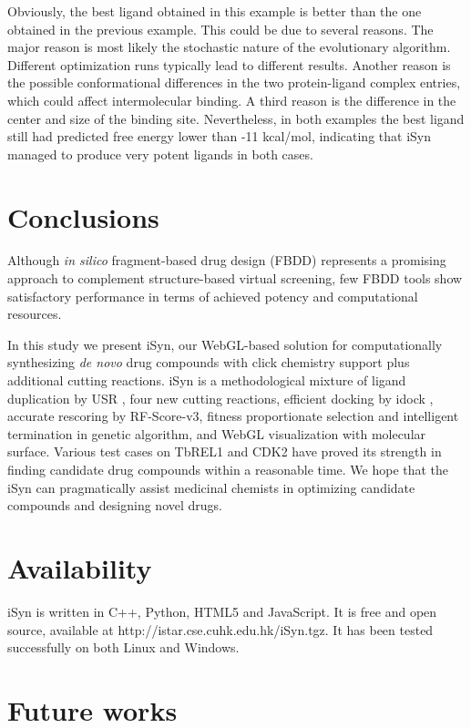 Obviously, the best ligand obtained in this example is better than the one obtained in the previous example. This could be due to several reasons. The major reason is most likely the stochastic nature of the evolutionary algorithm. Different optimization runs typically lead to different results. Another reason is the possible conformational differences in the two protein-ligand complex entries, which could affect intermolecular binding. A third reason is the difference in the center and size of the binding site. Nevertheless, in both examples the best ligand still had predicted free energy lower than -11 kcal/mol, indicating that iSyn managed to produce very potent ligands in both cases.

\section{Conclusions}

Although \textit{in silico} fragment-based drug design (FBDD) represents a promising approach to complement structure-based virtual screening, few FBDD tools show satisfactory performance in terms of achieved potency and computational resources.

In this study we present iSyn, our WebGL-based solution for computationally synthesizing \textit{de novo} drug compounds with click chemistry support plus additional cutting reactions. iSyn is a methodological mixture of ligand duplication by USR \citep{1379}, four new cutting reactions, efficient docking by idock \citep{1153}, accurate rescoring by RF-Score-v3, fitness proportionate selection and intelligent termination in genetic algorithm, and WebGL visualization with molecular surface. Various test cases on TbREL1 and CDK2 have proved its strength in finding candidate drug compounds within a reasonable time. We hope that the iSyn can pragmatically assist medicinal chemists in optimizing candidate compounds and designing novel drugs.

\section{Availability}

iSyn is written in C++, Python, HTML5 and JavaScript. It is free and open source, available at http://istar.cse.cuhk.edu.hk/iSyn.tgz. It has been tested successfully on both Linux and Windows.

\section{Future works}

